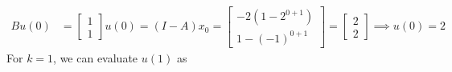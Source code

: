 \begin{align*}
    B u(0)
     & =
    \left[\begin{array}{c}
                  1 \\
                  1
              \end{array}\right]
    u(0)
    =
    (I - A) x_0
    =
    \left[\begin{array}{c}
                  -2(1 - 2^{0 + 1}) \\
                  1 - (-1)^{0 + 1}
              \end{array}\right]
    =
    \left[\begin{array}{c}
                  2 \\
                  2
              \end{array}\right]
    \implies
    u(0)
    =
    2
\end{align*}
For \( k = 1 \), we can evaluate \( u(1) \) as
